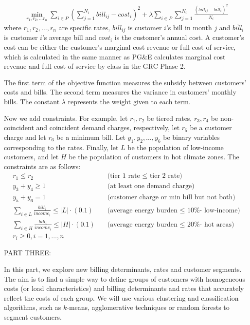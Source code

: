 \documentclass[12pt]{article}
\begin{document}
\begin{align*}
\min_{r_1, r_2, \dots r_n} \sum_{i \in P} \left(\sum_{j = 1}^{N_i} bill_{ij} - cost_i \right)^2 + \lambda \sum_{i \in P} \sum_{j = 1}^{N_i} \frac{(bill_{ij} - \overline{bill_i})^2}{N_i}
\end{align*}
where $r_1, r_2, \dots, r_n$ are specific rates, $bill_{ij}$ is customer $i$'s bill in month $j$ and $\overline{bill_i}$ is customer $i$'s average bill and $cost_i$ is the customer's annual cost. A customer's cost can be either the customer's marginal cost revenue or full cost of service, which is calculated in the same manner as PG\&E calculates marginal cost revenue and full cost of service by class in the GRC Phase 2.

The first term of the objective function measures the subsidy between customers' costs and bills. The second term measures the variance in customers' monthly bills. The constant $\lambda$ represents the weight given to each term.

Now we add constraints. For example, let $r_1, r_2$ be tiered rates, $r_3, r_4$ be non-coincident and coincident demand charges, respectively, let $r_5$ be a customer charge and let $r_6$ be a minimum bill. Let $y_1, y_2, \dots, y_6$ be binary variables corresponding to the rates. Finally, let $L$ be the population of low-income customers, and let $H$ be the population of customers in hot climate zones. The constraints are as follows:  
\begin{align}
	r_1 \leq r_2 & \quad \mbox{(tier 1 rate $\leq$ tier 2 rate)} \\
	y_3 + y_4 \geq 1 & \quad \mbox{(at least one demand charge)} \\
	y_5 + y_6 = 1 & \quad \mbox{(customer charge or min bill but not both)}\\
	\sum_{i \in L} \frac{bill_i}{income_i} \leq |L| \cdot (0.1) & \quad \mbox{(average energy burden $\leq$ 10\% - low-income)} \\
	\sum_{i \in H} \frac{bill_i}{income_i} \leq |H| \cdot (0.1) & \quad \mbox{(average energy burden $\leq$ 20\% - hot areas)} \\
	r_i \geq 0, i = 1, \dots, n		
\end{align}

\noindent PART THREE:

In this part, we explore new billing determinants, rates and customer segments. The aim is to find a simple way to define groups of customers with homogeneous costs (or load characteristics) and billing determinants and rates that accurately reflect the costs of each group. We will use various clustering and classification algorithms, such as $k$-means, agglomerative techniques or random forests to segment customers. \newline
\end{document}
